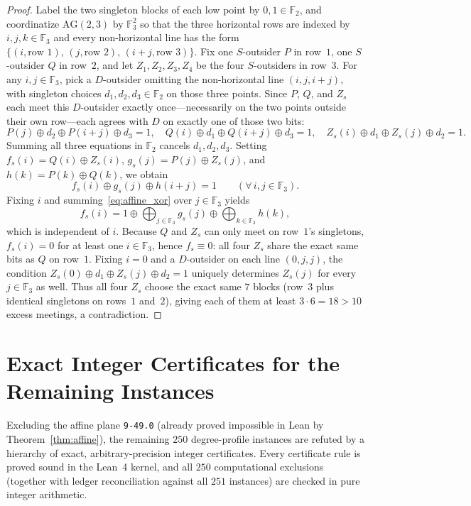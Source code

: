 \documentclass[11pt,a4paper]{article}
\theoremstyle{definition}
\theoremstyle{remark}
\newcommand{\AG}{\mathrm{AG}}
\newcommand{\F}{\mathbb{F}}
\begin{document}
\begin{proof}
Label the two singleton blocks of each low point by $0, 1 \in \F_2$, and coordinatize $\AG(2,3)$ by $\F_3^2$ so that the three horizontal rows are indexed by $i, j, k \in \F_3$ and every non-horizontal line has the form $\{(i,\text{row }1),\,(j,\text{row }2),\,(i+j,\text{row }3)\}$. Fix one $S$-outsider $P$ in row~$1$, one $S$-outsider $Q$ in row~$2$, and let $Z_1, Z_2, Z_3, Z_4$ be the four $S$-outsiders in row~$3$. For any $i, j \in \F_3$, pick a $D$-outsider omitting the non-horizontal line $(i, j, i+j)$, with singleton choices $d_1, d_2, d_3 \in \F_2$ on those three points. Since $P$, $Q$, and $Z_s$ each meet this $D$-outsider exactly once—necessarily on the two points outside their own row—each agrees with $D$ on exactly one of those two bits:
\[
  P(j) \oplus d_2 \oplus P(i+j) \oplus d_3 = 1,\quad
  Q(i) \oplus d_1 \oplus Q(i+j) \oplus d_3 = 1,\quad
  Z_s(i) \oplus d_1 \oplus Z_s(j) \oplus d_2 = 1.
\]
Summing all three equations in $\F_2$ cancels $d_1, d_2, d_3$. Setting $f_s(i) = Q(i) \oplus Z_s(i)$, $g_s(j) = P(j) \oplus Z_s(j)$, and $h(k) = P(k) \oplus Q(k)$, we obtain
\begin{equation}\label{eq:affine_xor}
  f_s(i) \oplus g_s(j) \oplus h(i+j) = 1 \qquad (\forall\, i, j \in \F_3).
\end{equation}
Fixing $i$ and summing~\eqref{eq:affine_xor} over $j \in \F_3$ yields
\[
  f_s(i) = 1 \oplus \bigoplus_{j \in \F_3} g_s(j) \oplus \bigoplus_{k \in \F_3} h(k),
\]
which is independent of $i$. Because $Q$ and $Z_s$ can only meet on row~$1$'s singletons, $f_s(i) = 0$ for at least one $i \in \F_3$, hence $f_s \equiv 0$: all four $Z_s$ share the exact same bits as $Q$ on row~$1$. Fixing $i = 0$ and a $D$-outsider on each line $(0, j, j)$, the condition $Z_s(0) \oplus d_1 \oplus Z_s(j) \oplus d_2 = 1$ uniquely determines $Z_s(j)$ for every $j \in \F_3$ as well. Thus all four $Z_s$ choose the exact same $7$ blocks (row~$3$ plus identical singletons on rows~$1$ and~$2$), giving each of them at least $3 \cdot 6 = 18 > 10$ excess meetings, a contradiction.
\end{proof}

\section{Exact Integer Certificates for the Remaining Instances}\label{sec:certificates}

Excluding the affine plane \texttt{9-49.0} (already proved impossible in Lean by Theorem~\ref{thm:affine}), the remaining $250$ degree-profile instances are refuted by a hierarchy of exact, arbitrary-precision integer certificates. Every certificate rule is proved sound in the Lean~4 kernel, and all $250$ computational exclusions (together with ledger reconciliation against all $251$ instances) are checked in pure integer arithmetic.
\end{document}
